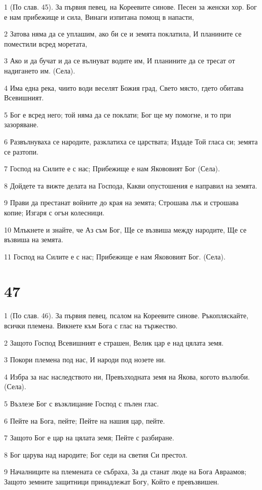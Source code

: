\par 1 (По слав. 45). За първия певец, на Кореевите синове. Песен за женски хор. Бог е нам прибежище и сила, Винаги изпитана помощ в напасти,
\par 2 Затова няма да се уплашим, ако би се и земята поклатила, И планините се поместили всред моретата,
\par 3 Ако и да бучат и да се вълнуват водите им, И планините да се тресат от надигането им. (Села).
\par 4 Има една река, чиито води веселят Божия град, Свето място, гдето обитава Всевишният.
\par 5 Бог е всред него; той няма да се поклати; Бог ще му помогне, и то при зазоряване.
\par 6 Развълнуваха се народите, разклатиха се царствата; Издаде Той гласа си; земята се разтопи.
\par 7 Господ на Силите е с нас; Прибежище е нам Якововият Бог (Села).
\par 8 Дойдете та вижте делата на Господа, Какви опустошения е направил на земята.
\par 9 Прави да престанат войните до края на земята; Строшава лък и строшава копие; Изгаря с огън колесници.
\par 10 Млъкнете и знайте, че Аз съм Бог, Ще се възвиша между народите, Ще се възвиша на земята.
\par 11 Господ на Силите е с нас; Прибежище е нам Якововият Бог. (Села).

\chapter{47}

\par 1 (По слав. 46). За първия певец, псалом на Кореевите синове. Ръкопляскайте, всички племена. Викнете към Бога с глас на тържество.
\par 2 Защото Господ Всевишният е страшен, Велик цар е над цялата земя.
\par 3 Покори племена под нас, И народи под нозете ни.
\par 4 Избра за нас наследството ни, Превъзходната земя на Якова, когото възлюби. (Села).
\par 5 Възлезе Бог с възклицание Господ с пълен глас.
\par 6 Пейте на Бога, пейте; Пейте на нашия цар, пейте.
\par 7 Защото Бог е цар на цялата земя; Пейте с разбиране.
\par 8 Бог царува над народите; Бог седи на светия Си престол.
\par 9 Началниците на племената се събраха, За да станат люде на Бога Авраамов; Защото земните защитници принадлежат Богу, Който е превъзвишен.

